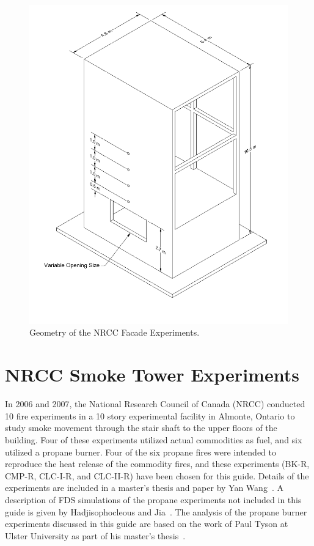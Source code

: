 \begin{figure}[p]
\includegraphics[width=\textwidth]{FIGURES/NRCC_Facade/NRCC_Facade}
\caption[Geometry of the NRCC Facade Experiments]{Geometry of the NRCC Facade Experiments.}
\label{NRCC_Facade_Drawing}
\end{figure}


\section{NRCC Smoke Tower Experiments}
\label{NRCC_Smoke_Tower_Description}

In 2006 and 2007, the National Research Council of Canada (NRCC) conducted 10 fire experiments in a 10 story experimental facility in Almonte, Ontario to study smoke movement through the stair shaft to the upper floors of the building. Four of these experiments utilized actual commodities as fuel, and six utilized a propane burner. Four of the six propane fires were intended to reproduce the heat release of the commodity fires, and these experiments (BK-R, CMP-R, CLC-I-R, and CLC-II-R) have been chosen for this guide. Details of the experiments are included in a master's thesis and paper by Yan Wang~\cite{Wang:Thesis,Wang:FT2011}. A description of FDS simulations of the propane experiments not included in this guide is given by Hadjisophocleous and Jia~\cite{Hadjisophocleous:FT2009}. The analysis of the propane burner experiments discussed in this guide are based on the work of Paul Tyson at Ulster University as part of his master's thesis~\cite{Tyson:Thesis}.

